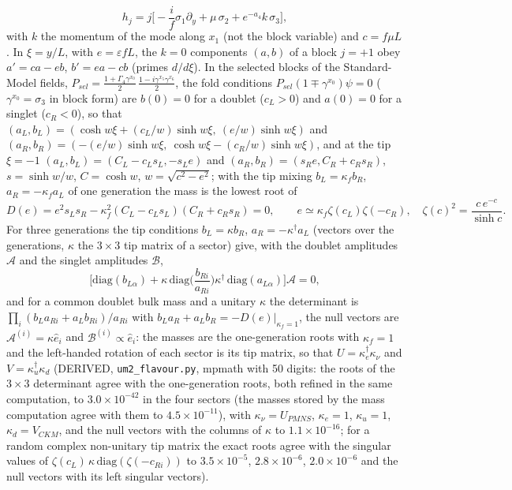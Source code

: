 \documentclass[
  10pt,
]{article}
\begin{document}
\[ h_j = j\Big[-\frac{i}{f}\sigma_1\partial_y + \mu\,\sigma_2 + e^{-a_4}k\,\sigma_3\Big],\]
with \(k\) the momentum of the mode along \(x_1\) (not the block
variable) and \(c = f\mu L\). In \(\xi = y/L\), with
\(e = \varepsilon fL\), the \(k = 0\) components \((a, b)\) of a block
\(j = +1\) obey \(a' = ca - eb\), \(b' = ea - cb\) (primes \(d/d\xi\)).
In the selected blocks of the Standard-Model fields,
\(P_{sel} = \frac{1 + \Gamma_4\gamma^{x_0}}{2}\,\frac{1 - i\gamma^{x_5}\gamma^{x_6}}{2}\),
the fold conditions \(P_{sel}(1 \mp \gamma^{x_0})\psi = 0\)
(\(\gamma^{x_0} = \sigma_3\) in block form) are \(b(0) = 0\) for a
doublet (\(c_L > 0\)) and \(a(0) = 0\) for a singlet (\(c_R < 0\)), so
that \((a_L, b_L) = (\cosh w\xi + (c_L/w)\sinh w\xi,\ (e/w)\sinh w\xi)\)
and
\((a_R, b_R) = (-(e/w)\sinh w\xi,\ \cosh w\xi - (c_R/w)\sinh w\xi)\),
and at the tip \(\xi = -1\) \((a_L, b_L) = (C_L - c_Ls_L, -s_Le)\) and
\((a_R, b_R) = (s_Re, C_R + c_Rs_R)\), \(s = \sinh w/w\),
\(C = \cosh w\), \(w = \sqrt{c^2 - e^2}\); with the tip mixing
\(b_L = \kappa_fb_R\), \(a_R = -\kappa_fa_L\) of one generation the mass
is the lowest root of
\[ D(e) = e^2s_Ls_R - \kappa_f^2(C_L - c_Ls_L)(C_R + c_Rs_R) = 0,\qquad e \simeq \kappa_f\zeta(c_L)\zeta(-c_R),\quad \zeta(c)^2 = \frac{c\,e^{-c}}{\sinh c}.\]
For three generations the tip conditions \(b_L = \kappa b_R\),
\(a_R = -\kappa^\dagger a_L\) (vectors over the generations, \(\kappa\)
the \(3\times3\) tip matrix of a sector) give, with the doublet
amplitudes \(\mathcal A\) and the singlet amplitudes \(\mathcal B\),
\[ \Big[\mathrm{diag}(b_{L\alpha}) + \kappa\,\mathrm{diag}\Big(\frac{b_{Ri}}{a_{Ri}}\Big)\kappa^\dagger\,\mathrm{diag}(a_{L\alpha})\Big]\mathcal A = 0, \]
and for a common doublet bulk mass and a unitary \(\kappa\) the
determinant is \(\prod_i(b_La_{Ri} + a_Lb_{Ri})/a_{Ri}\) with
\(b_La_R + a_Lb_R = -D(e)\vert_{\kappa_f = 1}\), the null vectors are
\(\mathcal A^{(i)} = \kappa\hat e_i\) and
\(\mathcal B^{(i)} \propto \hat e_i\): the masses are the one-generation
roots with \(\kappa_f = 1\) and the left-handed rotation of each sector
is its tip matrix, so that \(U = \kappa_e^\dagger\kappa_\nu\) and
\(V = \kappa_u^\dagger\kappa_d\) (DERIVED, \texttt{um2\_flavour.py},
mpmath with 50 digits: the roots of the \(3\times3\) determinant agree
with the one-generation roots, both refined in the same computation, to
\(3.0\times10^{-42}\) in the four sectors (the masses stored by the mass
computation agree with them to \(4.5\times10^{-11}\)), with
\(\kappa_\nu = U_{PMNS}\), \(\kappa_e = 1\), \(\kappa_u = 1\),
\(\kappa_d = V_{CKM}\), and the null vectors with the columns of
\(\kappa\) to \(1.1\times10^{-16}\); for a random complex non-unitary
tip matrix the exact roots agree with the singular values of
\(\zeta(c_L)\,\kappa\,\mathrm{diag}(\zeta(-c_{Ri}))\) to
\(3.5\times10^{-5}\), \(2.8\times10^{-6}\), \(2.0\times10^{-6}\) and the
null vectors with its left singular vectors).
\end{document}
